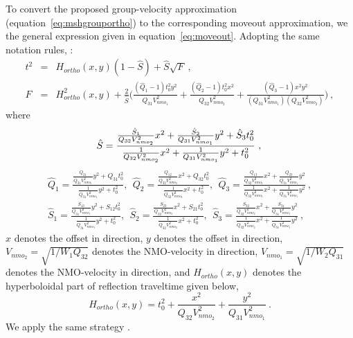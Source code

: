 To convert the proposed group-velocity approximation (equation~\ref{eq:mshgrouportho}) to the corresponding moveout approximation, we  the general expression given in equation~\ref{eq:moveout}. Adopting the same notation rules,  :
\begin{eqnarray}
\label{eq:orthomoveout}
t^2 & = & H_{ortho}(x,y)(1-\hat{S}) + \hat{S}\sqrt{F}~,\\
\nonumber
F & = & H^2_{ortho}(x,y)+ \frac{2}{\hat{S}}\bigg(\frac{(\hat{Q}_1-1)t^2_0y^2}{Q_{31}V^2_{nmo_1}} + \frac{(\hat{Q}_2-1)t^2_0x^2}{Q_{32}V^2_{nmo_2}}+ \frac{(\hat{Q}_3-1)x^2y^2}{(Q_{31}V^2_{nmo_1})(Q_{32}V^2_{nmo_2})}\bigg)~,
\end{eqnarray}
where
\begin{equation}
\hat{S} = \frac{\frac{\hat{S}_1}{Q_{32}V^2_{nmo_2}}x^2 + \frac{\hat{S}_2}{Q_{31}V^2_{nmo_1}}y^2 + \hat{S}_3t^2_0}{\frac{1}{Q_{32}V^2_{nmo_2}}x^2 + \frac{1}{Q_{31}V^2_{nmo_1}}y^2 + t^2_0}~,\\
\end{equation}
\begin{eqnarray}
\hat{Q}_1 =\frac{\frac{Q_{21}}{Q_{31}V^2_{nmo_1}}y^2 + Q_{31}t^2_0}{\frac{1}{Q_{31}V^2_{nmo_1}}y^2 + t^2_0},~~
\hat{Q}_2 = \frac{\frac{Q_{12}}{Q_{32}V^2_{nmo_2}}x^2 + Q_{32}t^2_0}{\frac{1}{Q_{32}V^2_{nmo_2}}x^2 + t^2_0},~~
\hat{Q}_3 = \frac{\frac{Q_{13}}{Q_{32}V^2_{nmo_2}}x^2 + \frac{Q_{23}}{Q_{31}V^2_{nmo_1}}y^2}{\frac{1}{Q_{32}V^2_{nmo_2}}x^2 + \frac{1}{Q_{31}V^2_{nmo_1}}y^2}~,\\
\hat{S}_1 = \frac{\frac{S_{13}}{Q_{31}V^2_{nmo_1}}y^2 + S_{12}t^2_0}{\frac{1}{Q_{31}V^2_{nmo_1}}y^2 + t^2_0},~~
\hat{S}_2 = \frac{\frac{S_{23}}{Q_{32}V^2_{nmo_2}}x^2 + S_{21}t^2_0}{\frac{1}{Q_{32}V^2_{nmo_2}}x^2 + t^2_0},~~
\hat{S}_3 = \frac{\frac{S_{32}}{Q_{32}V^2_{nmo_2}}x^2 + \frac{S_{31}}{Q_{31}V^2_{nmo_1}}y^2}{\frac{1}{Q_{32}V^2_{nmo_2}}x^2 + \frac{1}{Q_{31}V^2_{nmo_1}}y^2}~,
\end{eqnarray}
$x$ denotes the offset in  direction, $y$ denotes the offset in  direction, $V_{nmo_2} = \sqrt{1/W_1Q_{32}}$ denotes the NMO-velocity in  direction, $V_{nmo_1} = \sqrt{1/W_2Q_{31}}$ denotes the NMO-velocity in  direction, 
and $H_{ortho}(x,y)$ denotes the hyperboloidal part of reflection traveltime  given below,
\begin{equation}
H_{ortho}(x,y) = t^2_0 + \frac{x^2}{Q_{32}V^2_{nmo_2}} + \frac{y^2}{Q_{31}V^2_{nmo_1}}~.
\end{equation}
We apply the same strategy .

